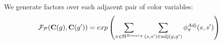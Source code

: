  We generate factors over each adjacent pair of color variables:
  \begin{equation*}
 \mathcal{F}_{\mathcal{P}}(\mathbf{C}(g), \mathbf{C}(g^{\prime})) = exp\left(\sum_{\pi \in \Pi^{Binary}}\sum_{(s, s^{\prime}) \in \text{adj}(g, g^{\prime})} \phi^{Adj}_\pi(s, s^{\prime})\right) 
 \end{equation*}






